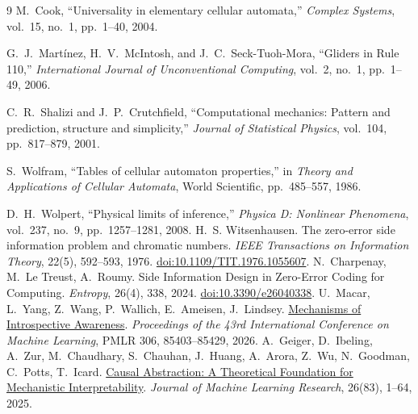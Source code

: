 \begin{thebibliography}{9}
M.~Cook, ``Universality in elementary cellular automata,'' \emph{Complex Systems}, vol.~15, no.~1, pp.~1--40, 2004.

G.~J.~Mart\'inez, H.~V.~McIntosh, and J.~C.~Seck-Tuoh-Mora, ``Gliders in Rule 110,'' \emph{International Journal of Unconventional Computing}, vol.~2, no.~1, pp.~1--49, 2006.

C.~R.~Shalizi and J.~P.~Crutchfield, ``Computational mechanics: Pattern and prediction, structure and simplicity,'' \emph{Journal of Statistical Physics}, vol.~104, pp.~817--879, 2001.

S.~Wolfram, ``Tables of cellular automaton properties,'' in \emph{Theory and Applications of Cellular Automata}, World Scientific, pp.~485--557, 1986.

D.~H.~Wolpert, ``Physical limits of inference,'' \emph{Physica D: Nonlinear Phenomena}, vol.~237, no.~9, pp.~1257--1281, 2008.
H.~S. Witsenhausen. The zero-error side information problem and chromatic numbers.
\emph{IEEE Transactions on Information Theory}, 22(5), 592--593, 1976.
\href{https://doi.org/10.1109/TIT.1976.1055607}{doi:10.1109/TIT.1976.1055607}.
N.~Charpenay, M.~Le Treust, A.~Roumy. Side Information Design in Zero-Error Coding for Computing.
\emph{Entropy}, 26(4), 338, 2024.
\href{https://doi.org/10.3390/e26040338}{doi:10.3390/e26040338}.
U.~Macar, L.~Yang, Z.~Wang, P.~Wallich, E.~Ameisen, J.~Lindsey.
\href{https://proceedings.mlr.press/v306/macar26a.html}{Mechanisms of Introspective Awareness}.
\emph{Proceedings of the 43rd International Conference on Machine Learning}, PMLR 306, 85403--85429, 2026.
A.~Geiger, D.~Ibeling, A.~Zur, M.~Chaudhary, S.~Chauhan, J.~Huang, A.~Arora, Z.~Wu, N.~Goodman, C.~Potts, T.~Icard.
\href{https://www.jmlr.org/papers/v26/23-0058.html}{Causal Abstraction: A Theoretical Foundation for Mechanistic Interpretability}.
\emph{Journal of Machine Learning Research}, 26(83), 1--64, 2025.
\end{thebibliography}
